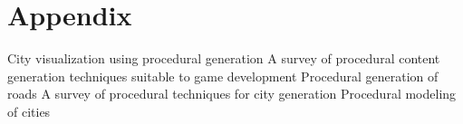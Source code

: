 \appendix
\chapter{Appendix}

City visualization using procedural generation\cite{abrahamcity}\newline
A survey of procedural content generation techniques suitable to game development\cite{de2011survey}\newline
Procedural generation of roads\cite{galin2010procedural}\newline
A survey of procedural techniques for city generation\cite{kelly2006survey}\newline
Procedural modeling of cities\cite{parish2001procedural}\newline
